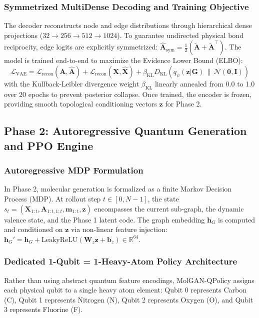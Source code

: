 \documentclass[10pt,a4paper]{article}
\begin{document}
\subsubsection*{Symmetrized MultiDense Decoding and Training Objective}
The decoder reconstructs node and edge distributions through hierarchical dense projections ($32 \to 256 \to 512 \to 1024$). To guarantee undirected physical bond reciprocity, edge logits are explicitly symmetrized: $\hat{\mathbf{A}}_{\text{sym}} = \frac{1}{2}(\tilde{\mathbf{A}} + \tilde{\mathbf{A}}^\top)$. The model is trained end-to-end to maximize the Evidence Lower Bound (ELBO):
\begin{equation}
\mathcal{L}_{\text{VAE}} = \mathcal{L}_{\text{recon}}(\mathbf{A}, \hat{\mathbf{A}}) + \mathcal{L}_{\text{recon}}(\mathbf{X}, \hat{\mathbf{X}}) + \beta_{\text{KL}} D_{\text{KL}}\left( q_\psi(\mathbf{z}|\mathbf{G}) \,\|\, \mathcal{N}(\mathbf{0}, \mathbf{I}) \right)
\end{equation}
with the Kullback-Leibler divergence weight $\beta_{\text{KL}}$ linearly annealed from 0.0 to 1.0 over 20 epochs to prevent posterior collapse. Once trained, the encoder is frozen, providing smooth topological conditioning vectors $\mathbf{z}$ for Phase 2.

\subsection{Phase 2: Autoregressive Quantum Generation and PPO Engine}

\subsubsection*{Autoregressive MDP Formulation}
In Phase 2, molecular generation is formalized as a finite Markov Decision Process (MDP). At rollout step $t \in [0, N-1]$, the state $s_t = (\mathbf{X}_{1:t}, \mathbf{A}_{1:t, 1:t}, \mathbf{m}_{1:t}, \mathbf{z})$ encompasses the current sub-graph, the dynamic valence state, and the Phase 1 latent code. The graph embedding $\mathbf{h}_G$ is computed and conditioned on $\mathbf{z}$ via non-linear feature injection: $\mathbf{h}_G' = \mathbf{h}_G + \text{LeakyReLU}(\mathbf{W}_z \mathbf{z} + \mathbf{b}_z) \in \mathbb{R}^{64}$.

\subsubsection*{Dedicated 1-Qubit = 1-Heavy-Atom Policy Architecture}
Rather than using abstract quantum feature encodings, MolGAN-QPolicy assigns each physical qubit to a single heavy atom element: Qubit 0 represents Carbon (C), Qubit 1 represents Nitrogen (N), Qubit 2 represents Oxygen (O), and Qubit 3 represents Fluorine (F).
\end{document}
